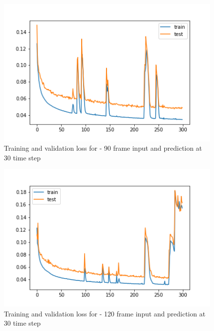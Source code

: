 \begin{figure}[H] 
\includegraphics[scale=0.8]{conf17_300e_90_30ffuture}
\begin{center}
\caption{Training and validation loss for - 90 frame input and prediction at 30 time step }
\label{90-30}
\end{center}
\end{figure}

\begin{figure}[H] 
\includegraphics[scale=0.8]{conf18_300e_120_30ffuture}
\begin{center}
\caption{Training and validation loss for - 120 frame input and prediction at 30 time step }
\label{120-30}
\end{center}
\end{figure}

